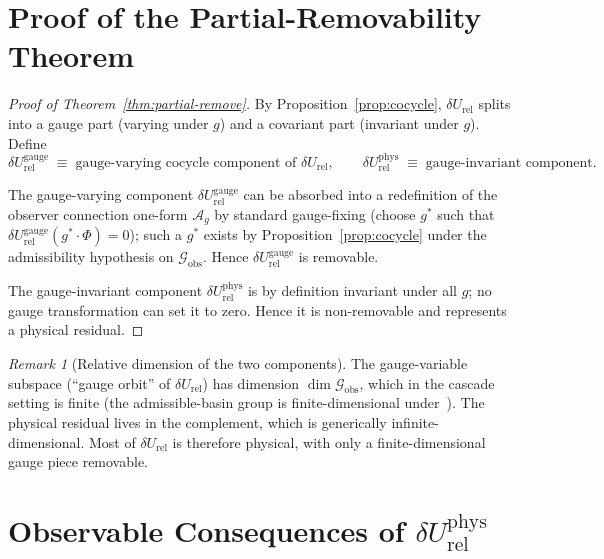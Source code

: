 \documentclass[12pt]{article}
\theoremstyle{definition}
\theoremstyle{remark}
\newtheorem{remark}[theorem]{Remark}
\newcommand{\dUrel}{\delta U_{\mathrm{rel}}}
\begin{document}
\section{Proof of the Partial-Removability Theorem}\label{sec:theorem}

\begin{proof}[Proof of Theorem~\ref{thm:partial-remove}]
By Proposition~\ref{prop:cocycle}, $\dUrel$ splits into a gauge part (varying under $g$) and a covariant part (invariant under $g$). Define
\begin{equation}
\dUrel^{\mathrm{gauge}} \;\equiv\; \text{gauge-varying cocycle component of } \dUrel,
\qquad
\dUrel^{\mathrm{phys}} \;\equiv\; \text{gauge-invariant component}.
\end{equation}

The gauge-varying component $\dUrel^{\mathrm{gauge}}$ can be absorbed into a redefinition of the observer connection one-form $\mathcal{A}_g$ by standard gauge-fixing (choose $g^*$ such that $\dUrel^{\mathrm{gauge}}(g^* \cdot \Phi) = 0$); such a $g^*$ exists by Proposition~\ref{prop:cocycle} under the admissibility hypothesis on $\mathcal{G}_{\mathrm{obs}}$. Hence $\dUrel^{\mathrm{gauge}}$ is removable.

The gauge-invariant component $\dUrel^{\mathrm{phys}}$ is by definition invariant under all $g$; no gauge transformation can set it to zero. Hence it is non-removable and represents a physical residual.
\end{proof}

\begin{remark}[Relative dimension of the two components]
The gauge-variable subspace (``gauge orbit'' of $\dUrel$) has dimension $\dim \mathcal{G}_{\mathrm{obs}}$, which in the cascade setting is finite (the admissible-basin group is finite-dimensional under~\citep{SmartXXIX}). The physical residual lives in the complement, which is generically infinite-dimensional. Most of $\dUrel$ is therefore physical, with only a finite-dimensional gauge piece removable.
\end{remark}

\section{Observable Consequences of $\dUrel^{\mathrm{phys}}$}\label{sec:observables}
\end{document}

